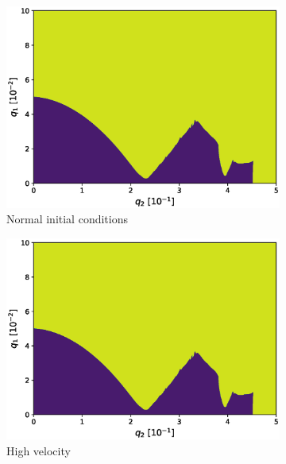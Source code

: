 \begin{figure}[H]
\begin{subfigure}{.3\textwidth}
  \centering
  \includegraphics[width=\linewidth]{img/0_ions_1_electrons_q1_0.0-0.1_q2_0.0-0.5_960x960_3.eps}
  \caption{Normal initial conditions}
  \label{fig:normal_conds-3}
\end{subfigure}%
\begin{subfigure}{.3\textwidth}
  \centering
  \includegraphics[width=\linewidth]{img/0_ions_1_electrons_q1_0.0-0.1_q2_0.0-0.5_960x960_3.eps}
  \caption{High velocity}
  \label{fig:high_velocity-3}
\end{subfigure}%
\begin{subfigure}{.3\textwidth}
  \centering

\end{subfigure}
\end{figure}
